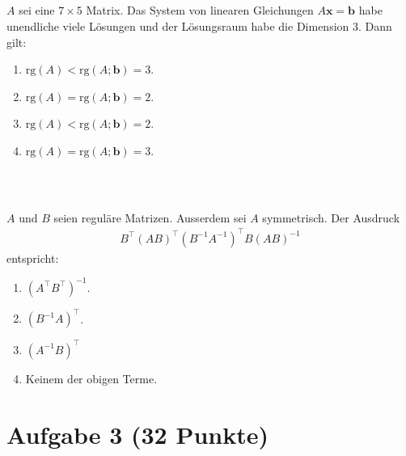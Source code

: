 \subsection*{}
$ A $ sei eine $ 7 \times 5 $ Matrix. Das System von linearen Gleichungen $ A \textbf{x} = \textbf{b} $ habe unendliche viele Lösungen und der Lösungsraum habe die Dimension $ 3 $. Dann gilt:
\renewcommand{\labelenumi}{(\alph{enumi})}
\begin{enumerate}
	\item 
	$ \mathrm{rg}(A)< \mathrm{rg}(A;\textbf{b} ) =3 $.
	\item
	$ \mathrm{rg}(A)= \mathrm{rg}(A;\textbf{b} ) =2 $.
	
	\item
	$ \mathrm{rg}(A)< \mathrm{rg}(A;\textbf{b} ) =2 $.
	\item
	$ \mathrm{rg}(A)= \mathrm{rg}(A;\textbf{b} ) =3 $.
\end{enumerate}
\ \\
\subsection*{}
$ A $ und $ B $ seien reguläre Matrizen. Ausserdem sei $ A $ symmetrisch.
Der Ausdruck
\begin{align*}
B^\top (AB)^\top (B^{-1} A^{-1})^\top B (AB)^{-1}
\end{align*}
entspricht:
\begin{enumerate}
	\item 
	$ (A^\top B^\top)^{-1} $.
	\item
	$ (B^{-1} A)^\top $.
	
	\item
	$ (A^{-1} B )^\top $
	\item
	Keinem der obigen Terme.
\end{enumerate}
\newpage
\section*{Aufgabe 3 (32 Punkte)}
\vspace{0.4cm}

